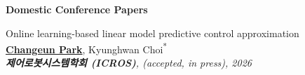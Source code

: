 
\footnotesize{\textbf{Domestic Conference Papers}

\begin{etaremune}

    \item {
        Online learning-based linear model predictive control approximation
        \\
        \textbf{\underline{Changeun Park}}, Kyunghwan Choi\textsuperscript{{*}}
        \\
        \textit{
            \textbf{제어로봇시스템학회 (ICROS)}, (accepted, in press), 2026
        }
    }

\end{etaremune}}
    